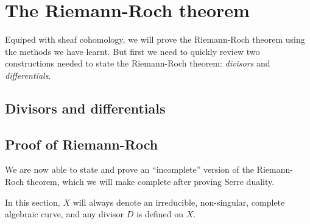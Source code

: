 \documentclass[12pt]{article}
\begin{document}
\section{The Riemann-Roch theorem}
Equiped with sheaf cohomology, we will prove the Riemann-Roch theorem
using the methods we have learnt. But first we need to quickly review
two constructions needed to state the Riemann-Roch theorem: \emph{divisors}
and \emph{differentials}.

\subsection{Divisors and differentials}

\subsection{Proof of Riemann-Roch}
We are now able to state and prove an ``incomplete'' version of the
Riemann-Roch theorem, which we will make complete after proving Serre
duality.

\begin{lnote}
  In this section, $X$ will always denote an irreducible, non-singular,
  complete algebraic curve, and any divisor $D$ is defined on $X$.
\end{lnote}

\end{document}
